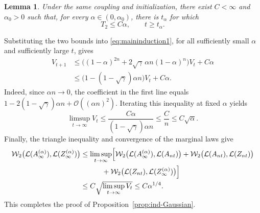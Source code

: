 \documentclass[11pt,letterpaper]{article}
\theoremstyle{plain}
\newtheorem{lemma}{Lemma}
\theoremstyle{definition}
\theoremstyle{remark}
\newcommand{\W}{\mathcal{W}}
\newcommand{\law}{\mathcal{L}}
\begin{document}
\begin{lemma}
\label{lem:SSCT2}
Under the same coupling and initialization, there exist \(C<\infty\) and
\(\alpha_0>0\) such that, for every \(\alpha\in(0,\alpha_0)\), there is
\(t_\alpha\) for which
\[
    T_2\leq C\alpha,
    \qquad t\geq t_\alpha.
\]
\end{lemma}

Substituting the two bounds into \eqref{eq:maininduction1}, for all
sufficiently small \(\alpha\) and sufficiently large \(t\), gives
\begin{align*}
    V_{t+1}
    &\leq\bigl((1-\alpha)^{2n}
          +2\sqrt\gamma\,\alpha n(1-\alpha)^n\bigr)V_t+C\alpha\\
    &\leq\bigl(1-(1-\sqrt\gamma)\alpha n\bigr)V_t+C\alpha.
\end{align*}
Indeed, since \(\alpha n\to0\), the coefficient in the first line equals
\(1-2(1-\sqrt\gamma)\alpha n+\mathcal O((\alpha n)^2)\).
Iterating this inequality at fixed \(\alpha\) yields
\[
    \limsup_{t\to\infty}V_t
    \leq\frac{C\alpha}{(1-\sqrt\gamma)\alpha n}
    \leq\frac{C}{n}
    \leq C\sqrt\alpha.
\]
Finally, the triangle inequality and convergence of the marginal laws give
\begin{align*}
    \W_2\bigl(\law(A_\infty^{(\alpha)}),\law(Z_\infty^{(\alpha)})\bigr)
    &\leq\limsup_{t\to\infty}\Bigl[
        \W_2\bigl(\law(A_\infty^{(\alpha)}),\law(A_{nt})\bigr)+
        \W_2\bigl(\law(A_{nt}),\law(Z_{nt})\bigr)\\
    &\hspace{3em}
        +\W_2\bigl(\law(Z_{nt}),\law(Z_\infty^{(\alpha)})\bigr)
      \Bigr]\\
    &\leq C\sqrt{\limsup_{t\to\infty}V_t}
    \leq C\alpha^{1/4}.
\end{align*}
This completes the proof of Proposition~\ref{prop:ind-Gaussian}.
\end{document}
